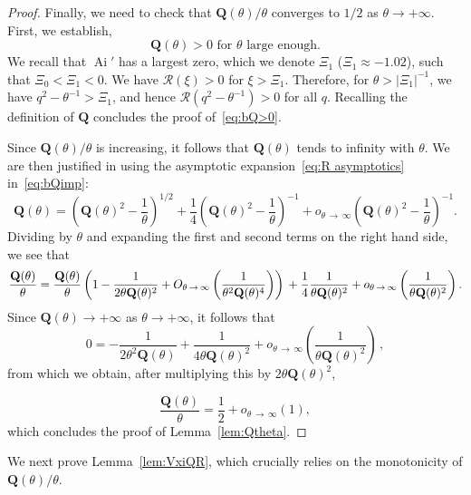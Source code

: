 \documentclass[AHL,Unicode,longabstracts]{cedram}
\DeclareMathOperator{\Ai}{Ai}
\newcommand{\bQ}{\mathbf{Q}}
\newcommand{\mR}{\mathcal{R}}
\newcommand{\1}{\mathds{1}}
\begin{document}
\begin{proof}
Finally, we need to check that $\bQ(\theta)/\theta$ converges to $1/2$ as $\theta\to +\infty$. First, we establish,
\begin{equation}\label{eq:bQ>0}
\bQ(\theta) > 0 \text{ for $\theta$ large enough.}
\end{equation}
We recall that $\Ai'$ has a largest zero, which we denote $\Xi_1$ ($\Xi_1\approx -1.02$), such that $\Xi_0< \Xi_1 <0$. We have $\mR(\xi)>0$ for $\xi>\Xi_1$. Therefore, for $\theta>|\Xi_1|^{-1}$, we have $q^2-\theta^{-1}> \Xi_1$, and hence $\mR(q^2-\theta^{-1})>0$ for all $q$. Recalling the definition of $\bQ$ concludes the proof of~\eqref{eq:bQ>0}.

Since $\bQ(\theta)/\theta$ is increasing, it follows that $\bQ(\theta)$ tends to infinity with $\theta$. We are then justified in using the asymptotic expansion~\eqref{eq:R asymptotics} in~\eqref{eq:bQimp}:
\[
\bQ(\theta) = \left(\bQ(\theta)^2 - \frac{1}{ \theta}\right)^{1/2} + \frac{1}{4}\left(\bQ(\theta)^2 - \frac{1}{ \theta}\right)^{-1} + o_{\theta\,\to\,\infty} \left(\bQ(\theta)^2 - \frac{1} {\theta}\right)^{-1}.
\]
Dividing by $\theta$ and expanding the first and second terms on the right hand side, we see that
\begin{equation*}
\frac{\bQ(\theta)}{\theta} = \frac{\bQ(\theta)}{\theta}\left(1 - \frac{1}{2\theta\bQ(\theta)^2} + O_{\theta\,\to\,\infty}\left(\frac{1}{\theta^2\bQ(\theta)^4}\right)\right)\\
+ \frac{1}{4}\frac{1}{\theta\bQ(\theta)^2} + o_{\theta\,\to\,\infty} \left(\frac{1}{\theta\bQ(\theta)^2}\right).
\end{equation*}
Since $\bQ(\theta)\to +\infty$ as $\theta\to +\infty$, it follows that
\[
0 = -\frac{1}{2\theta^2\bQ(\theta)} + \frac{1}{4\theta \bQ(\theta)^2} + o_{\theta\,\to\,\infty}\left(\frac{1}{\theta \bQ(\theta)^2}\right)\,,
\]
from which we obtain, after multiplying this by $2\theta \bQ(\theta)^2 $,

\[
\frac{\bQ(\theta)}{\theta} = \frac{1}{2} + o_{\theta\,\to\,\infty}(1),
\]
which concludes the proof of Lemma~\ref{lem:Qtheta}.
\end{proof}

We next prove Lemma~\ref{lem:VxiQR}, which crucially relies on the monotonicity of $\bQ(\theta)/\theta$.
\end{document}
